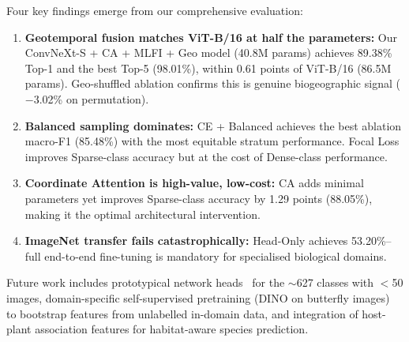 \documentclass[11pt]{article}
\begin{document}
Four key findings emerge from our comprehensive evaluation:
\begin{enumerate}[label=(\arabic*)]
    \item \textbf{Geotemporal fusion matches ViT-B/16 at half the parameters:} Our ConvNeXt-S + CA + MLFI + Geo model (40.8M params) achieves 89.38\% Top-1 and the best Top-5 (98.01\%), within 0.61 points of ViT-B/16 (86.5M params). Geo-shuffled ablation confirms this is genuine biogeographic signal ($-$3.02\% on permutation).
    \item \textbf{Balanced sampling dominates:} CE + Balanced achieves the best ablation macro-F1 (85.48\%) with the most equitable stratum performance. Focal Loss improves Sparse-class accuracy but at the cost of Dense-class performance.
    \item \textbf{Coordinate Attention is high-value, low-cost:} CA adds minimal parameters yet improves Sparse-class accuracy by 1.29 points (88.05\%), making it the optimal architectural intervention.
    \item \textbf{ImageNet transfer fails catastrophically:} Head-Only achieves 53.20\%--full end-to-end fine-tuning is mandatory for specialised biological domains.
\end{enumerate}

Future work includes prototypical network heads~\cite{snell2017prototypical} for the $\sim$627 classes with $<$50 images, domain-specific self-supervised pretraining (DINO on butterfly images)~\cite{feichtenhofer2022masked} to bootstrap features from unlabelled in-domain data, and integration of host-plant association features for habitat-aware species prediction.

\newpage


\end{document}
